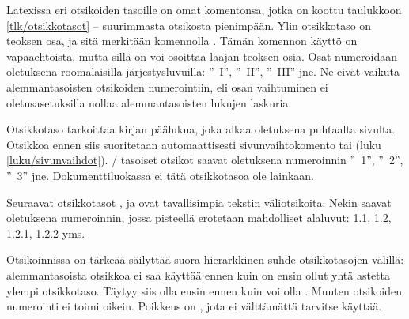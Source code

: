 
Latexissa eri otsikoiden tasoille on omat komentonsa, jotka on koottu
taulukkoon \ref{tlk/otsikkotasot} -- suurimmasta otsikosta pienimpään.
Ylin otsikkotaso on teoksen osa, ja sitä merkitään komennolla
. Tämän komennon käyttö on vapaaehtoista, mutta sillä on
voi osoittaa laajan teoksen osia. Osat numeroidaan oletuksena
roomalaisilla järjestysluvuilla: ''\partname~I'', ''\partname~II'',
''\partname~III'' jne. Ne eivät vaikuta alemmantasoisten otsikoiden
numerointiin, eli osan vaihtuminen ei oletusasetuksilla nollaa
alemmantasoisten lukujen laskuria.

Otsikkotaso  tarkoittaa kirjan päälukua, joka alkaa
oletuksena puhtaalta sivulta. Otsikkoa ennen siis suoritetaan
automaattisesti sivunvaihtokomento  tai
 (luku \ref{luku/sivunvaihdot}).
\-/ tasoiset otsikot saavat oletuksena numeroinnin
''\chaptername~1'', ''\chaptername~2'', ''\chaptername~3'' jne.
Dokumenttiluokassa  ei tätä otsikkotasoa ole lainkaan.

Seuraavat otsikkotasot ,  ja
 ovat tavallisimpia tekstin väliotsikoita. Nekin
saavat oletuksena numeroinnin, jossa pisteellä erotetaan mahdolliset
alaluvut: 1.1, 1.2, 1.2.1, 1.2.2 yms.

Otsikoinnissa on tärkeää säilyttää suora hierarkkinen suhde
otsikkotasojen välillä: alemmantasoista otsikkoa ei saa käyttää ennen
kuin on ensin ollut yhtä astetta ylempi otsikkotaso. Täytyy siis olla
ensin  ennen kuin voi olla . Muuten
otsikoiden numerointi ei toimi oikein. Poikkeus on , jota
ei välttämättä tarvitse käyttää.

